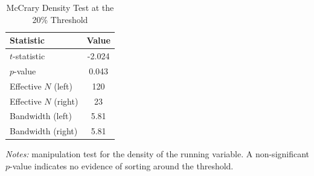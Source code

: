 \begin{table}[htbp]
\centering
\caption{McCrary Density Test at the 20\% Threshold}
\label{tab:density}
\begin{tabular}{lc}
\toprule
Statistic & Value \\
\midrule
$t$-statistic & -2.024 \\
$p$-value & 0.043 \\
Effective $N$ (left) & 120 \\
Effective $N$ (right) & 23 \\
Bandwidth (left) & 5.81 \\
Bandwidth (right) & 5.81 \\
\bottomrule
\end{tabular}
\begin{minipage}{0.75\textwidth}
\vspace{0.3em}
\footnotesize \textit{Notes:} \citet{cattaneo2020} manipulation test for the density of the running variable.
A non-significant $p$-value indicates no evidence of sorting around the threshold.
\end{minipage}
\end{table}
